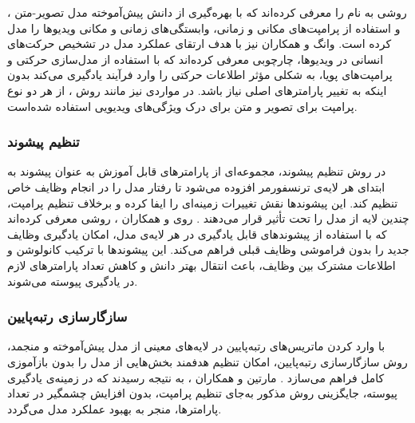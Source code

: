 \cite{pivot}،
روشی به نام
را معرفی کرده‌اند که با بهره‌گیری از دانش پیش‌آموخته مدل‌ تصویر-متن
و استفاده از پرامپت‌های مکانی
و زمانی، وابستگی‌های زمانی و مکانی ویدیوها را مدل کرده است. وانگ و همکاران \cite{clip-poolprompt} نیز با هدف ارتقای عملکرد مدل  در تشخیص حرکت‌های انسانی در ویدیوها، چارچوبی معرفی کرده‌اند که با استفاده از مدل‌سازی حرکتی و پرامپت‌های پویا، به شکلی مؤثر اطلاعات حرکتی را وارد فرآیند یادگیری می‌کند بدون اینکه به تغییر پارامتر‌های اصلی  نیاز باشد. در مواردی نیز مانند روش  
\cite{vilt-clip}،
از هر دو نوع پرامپت برای تصویر و متن برای درک ویژگی‌های ویدیویی استفاده شده‌است.

 
\subsubsection{تنظیم پیشوند}
 در روش تنظیم پیشوند، مجموعه‌ای از پارامتر‌های قابل آموزش به عنوان پیشوند به ابتدای هر لایه‌ی ترنسفورمر افزوده می‌شود تا رفتار مدل را در انجام وظایف خاص تنظیم کند. این پیشوندها نقش تغییرات زمینه‌ای را ایفا کرده و برخلاف تنظیم پرامپت، چندین لایه از مدل را تحت تأثیر قرار می‌دهند \cite{llm_continual}. روی و همکاران \cite{prefix-tuning}، روشی معرفی کرده‌اند که با استفاده از پیشوندهای قابل یادگیری در هر لایه‌ی مدل، امکان یادگیری وظایف جدید را بدون فراموشی وظایف قبلی فراهم می‌کند. این پیشوندها با ترکیب کانولوشن و اطلاعات مشترک بین وظایف، باعث انتقال بهتر دانش و کاهش تعداد پارامتر‌های لازم در یادگیری پیوسته می‌شوند.
 
\subsubsection{سازگار‌سازی رتبه‌پایین}
 با وارد کردن ماتریس‌های رتبه‌پایین در لایه‌های معینی از مدل پیش‌آموخته و منجمد، روش سازگار‌سازی رتبه‌پایین، امکان تنظیم هدفمند بخش‌هایی از مدل را بدون بازآموزی کامل فراهم می‌سازد \cite{llm_continual}. مارتین و همکاران \cite{lora}، به نتیجه رسیدند که در زمینه‌ی یادگیری پیوسته، جایگزینی روش مذکور به‌جای تنظیم پرامپت، بدون افزایش چشمگیر در تعداد پارامتر‌ها، منجر به بهبود عملکرد مدل می‌گردد.
 
